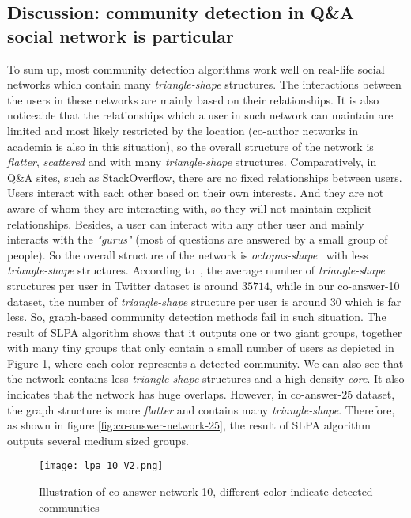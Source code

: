 \subsection{Discussion: community detection in Q\&A social network is particular}
To sum up, most community detection algorithms work well on real-life social networks which contain many \textit{triangle-shape} structures. The interactions between the users in these networks are mainly based on their relationships. It is also noticeable that the relationships which a user in such network can maintain are limited and most likely restricted by the location (co-author networks in academia is also in this situation), so the overall structure of the network is \textit{flatter}, \textit{scattered} and with many \textit{triangle-shape} structures. Comparatively, in Q\&A sites, such as StackOverflow, there are no fixed relationships between users. Users interact with each other based on their own interests. And they are not aware of whom they are interacting with, so they will not maintain explicit relationships. Besides, a user can interact with any other user and mainly interacts with the \textit{"gurus"} (most of questions are answered by a small group of people). So the overall structure of the network is \textit{octopus-shape}~\cite{leskovec2008statistical} with less \textit{triangle-shape} structures. According to~\cite{park2013efficient}, the average number of \textit{triangle-shape} structures per user in Twitter dataset is around $35714$, while in our co-answer-10 dataset, the number of \textit{triangle-shape} structure per user is around $30$ which is far less. So, graph-based community detection methods fail in such situation. The result of SLPA algorithm shows that it outputs one or two giant groups, together with many tiny groups that only contain a small number of users as depicted in Figure \ref{fig:co-answer-network-10}, where each color represents a detected community. We can also see that the network contains less \textit{triangle-shape} structures and a high-density \textit{core}. It also indicates that the network has huge overlaps. However, in co-answer-25 dataset, the graph structure is more \textit{flatter} and contains many \textit{triangle-shape}. Therefore, as shown in figure \ref{fig:co-answer-network-25}, the result of SLPA algorithm outputs several medium sized groups.


\begin{figure}[htp]
\centering
\texttt{[image: lpa\_10\_V2.png]}  %
\caption{Illustration of co-answer-network-10, different color indicate detected communities}
\label{fig:co-answer-network-10} %
\end{figure}

